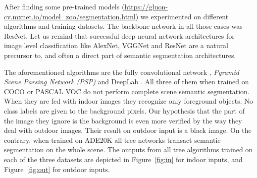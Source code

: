\documentclass[12pt,a4paper]{report}
\newcommand{\term}{\textit}
\newcommand{\acronym}{\MakeUppercase}
\begin{document}
	After finding some pre-trained models (\url{https://gluon-cv.mxnet.io/model_zoo/segmentation.html}) 
	we experimented on different algorithms and training datasets. The backbone network in 
	all those cases was ResNet. Let us remind that successful deep neural network architectures 
	for image level classification like AlexNet, VGGNet and ResNet are a natural precursor 
	to, and often a direct part of semantic segmentation architectures. 
	\par
	The aforementioned algorithms are the fully convolutional network \citep{Long}, 
	\term{Pyramid Scene Parsing Network (\acronym{psp})} \citep{Zhao} and DeepLab \citep{Chen}. 
	All three of them when trained on \acronym{coco} or \acronym{pascal voc} do not perform 
	complete scene semantic segmentation. When they are fed with indoor images they recognize 
	only foreground objects. No class labels are given to the background pixels. Our 
	hypothesis that the part of the image they ignore is the background is even more 
	verified by the way they deal with outdoor images. Their result on outdoor input is 
	a black image. On the contrary, when trained on \acronym{ade20k} all tree networks 
	transact semantic segmentation on the whole scene. The outputs from all tree algorithms 
	trained on each of the three datasets are depicted in Figure~\ref{fig:in} for indoor 
	inputs, and Figure~\ref{fig:out} for outdoor inputs.
	\\
	
\end{document}
